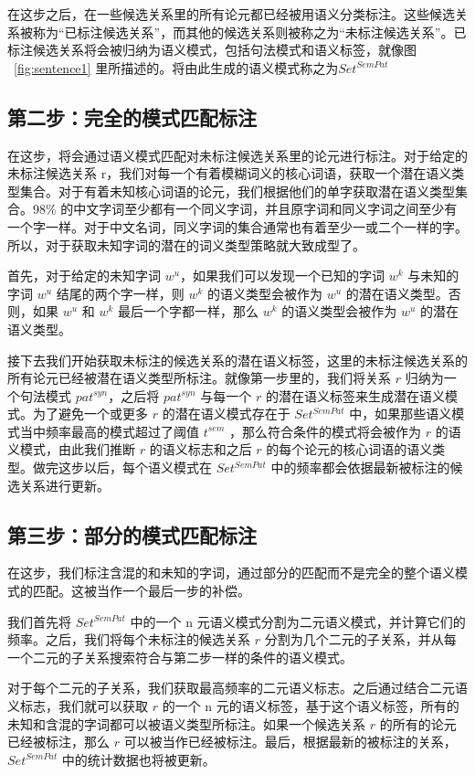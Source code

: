 在这步之后，在一些候选关系里的所有论元都已经被用语义分类标注。这些候选关系被称为“已标注候选关系”，而其他的候选关系则被称之为“未标注候选关系”。已标注候选关系将会被归纳为语义模式，包括句法模式和语义标签，就像图 ~\ref{fig:sentence1} 里所描述的。将由此生成的语义模式称之为$Set^{SemPat}$

\subsection{第二步：完全的模式匹配标注}
在这步，将会通过语义模式匹配对未标注候选关系里的论元进行标注。对于给定的未标注候选关系 r，我们对每一个有着模糊词义的核心词语，获取一个潜在语义类型集合。对于有着未知核心词语的论元，我们根据他们的单字获取潜在语义类型集合。98\% 的中文字词至少都有一个同义字词\citep{qiu2011}，并且原字词和同义字词之间至少有一个字一样。对于中文名词，同义字词的集合通常也有着至少一或二个一样的字。所以，对于获取未知字词的潜在的词义类型策略就大致成型了。

首先，对于给定的未知字词 $w^u$，如果我们可以发现一个已知的字词 $w^k$ 与未知的字词 $w^u$ 结尾的两个字一样，则 $w^k$ 的语义类型会被作为 $w^u$ 的潜在语义类型。否则，如果 $w^u$ 和 $w^k$ 最后一个字都一样，那么 $w^k$ 的语义类型会被作为 $w^u$ 的潜在语义类型。

接下去我们开始获取未标注的候选关系的潜在语义标签，这里的未标注候选关系的所有论元已经被潜在语义类型所标注。就像第一步里的，我们将关系 $r$ 归纳为一个句法模式 $pat^{syn}$，之后将 $pat^{syn}$ 与每一个 $r$ 的潜在语义标签来生成潜在语义模式。为了避免一个或更多 $r$ 的潜在语义模式存在于 $Set^{SemPat}$ 中，如果那些语义模式当中频率最高的模式超过了阈值 $t^{sem}$ ，那么符合条件的模式将会被作为 $r$ 的语义模式，由此我们推断 $r$ 的语义标志和之后 $r$ 的每个论元的核心词语的语义类型。做完这步以后，每个语义模式在 $Set^{SemPat}$ 中的频率都会依据最新被标注的候选关系进行更新。

\subsection{第三步：部分的模式匹配标注}
在这步，我们标注含混的和未知的字词，通过部分的匹配而不是完全的整个语义模式的匹配。这被当作一个最后一步的补偿。

我们首先将 $Set^{SemPat}$ 中的一个 n 元语义模式分割为二元语义模式，并计算它们的频率。之后，我们将每个未标注的候选关系 $r$ 分割为几个二元的子关系，并从每一个二元的子关系搜索符合与第二步一样的条件的语义模式。

对于每个二元的子关系，我们获取最高频率的二元语义标志。之后通过结合二元语义标志，我们就可以获取 $r$ 的一个 n 元的语义标签，基于这个语义标签，所有的未知和含混的字词都可以被语义类型所标注。如果一个候选关系 $r$ 的所有的论元已经被标注，那么 $r$ 可以被当作已经被标注。最后，根据最新的被标注的关系，$Set^{SemPat}$ 中的统计数据也将被更新。

